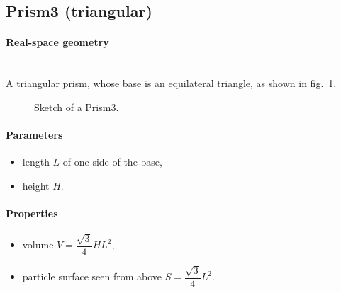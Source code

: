 \subsection{Prism3 (triangular)} 

\paragraph{Real-space geometry}\strut\\
A triangular prism, whose base is an equilateral
triangle, as shown in fig.~\ref{fig:prism3}.

\begin{figure}[ht]
\hfill
{}
\hfill
{}
\hfill
\caption{Sketch of a Prism3.}
\label{fig:prism3}
\end{figure}

\FloatBarrier

\paragraph{Parameters}
\begin{itemize}
\item length $L$ of one side of the base, 
\item height $H$.
\end{itemize}

\paragraph{Properties}
\begin{itemize}
\item volume $V= \dfrac{\sqrt{3}}{4} H L^2$,
\item particle surface seen from above $S =\dfrac{\sqrt{3}}{4}L^2$.

\end{itemize}

